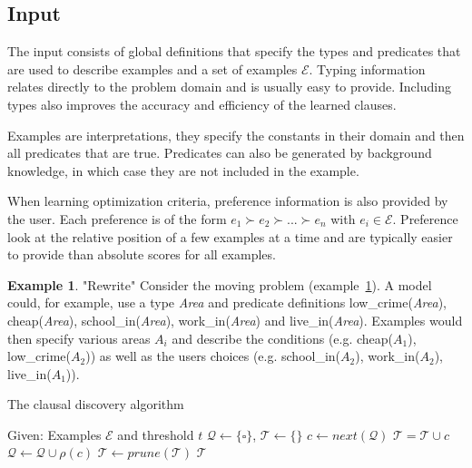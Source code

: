 \documentclass[letterpaper]{article}
\newcommand{\sym}[1]{\ensuremath{\mathcal{#1}}}
\theoremstyle{definition}
\newtheorem{example}{Example}
\begin{document}

\subsection{Input}
The input consists of global definitions that specify the types and predicates that are used to describe examples and a set of examples \sym{E}.
Typing information relates directly to the problem domain and is usually easy to provide.
Including types also improves the accuracy and efficiency of the learned clauses.

Examples are interpretations, they specify the constants in their domain and then all predicates that are true.
Predicates can also be generated by background knowledge, in which case they are not included in the example.

When learning optimization criteria, preference information is also provided by the user.
Each preference is of the form $e_1 \succ e_2 \succ ... \succ e_n$ with $e_i \in \sym{E}$.
Preference look at the relative position of a few examples at a time and are typically easier to provide than absolute scores for all examples.

\begin{example} "Rewrite"
  \label{ex:moving-input}
  Consider the moving problem (example~\ref{ex:moving-input}).
  A model could, for example, use a type \textit{Area} and predicate definitions low\_crime(\textit{Area}), cheap(\textit{Area}), school\_in(\textit{Area}), work\_in(\textit{Area}) and live\_in(\textit{Area}).
  Examples would then specify various areas $A_i$ and describe the conditions (e.g. cheap($A_1$), low\_crime($A_2$)) as well as the users choices (e.g. school\_in($A_2$), work\_in($A_2$), live\_in($A_1$)).
\end{example}

\begin{algorithm}
  \caption{The clausal discovery algorithm}
  \label{alg:cd}

  \begin{algorithmic}
  \State Given: Examples \sym{E} and threshold $t$
  \State $\sym{Q} \gets \{\square\}$, $\sym{T} \gets \{\}$
  \While{$\#\sym{Q} > 0$}
    \State $c \gets next(\sym{Q})$
    \If{$\#\{e \in \sym{E} | e \models c\} \geq t$}
      \If{$\lnot (\sym{T} \models c)$}
        \State $\sym{T} = \sym{T} \cup c$
      \EndIf
    \Else
      \State $\sym{Q} \gets \sym{Q} \cup \rho(c)$
    \EndIf
  \EndWhile
  \State $\sym{T} \gets prune(\sym{T})$
  \State \Return \sym{T}
  \end{algorithmic}
\end{algorithm}
\end{document}
